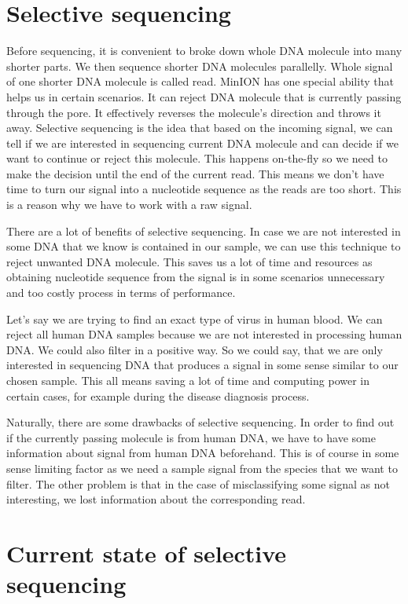 \section{Selective sequencing}

Before sequencing, it is convenient to broke down whole DNA molecule into many
shorter parts. We then sequence shorter DNA molecules parallelly. Whole signal
of one shorter DNA molecule is called read. MinION has one special ability that
helps us in certain scenarios. It can reject DNA molecule that is currently passing
through the pore. It effectively reverses the molecule’s direction and throws it away.
Selective sequencing is the idea that based on the incoming signal, we can tell
if we are interested in sequencing current DNA molecule and can decide if we want
to continue or reject this molecule. This happens on-the-fly so we need to make
the decision until the end of the current read. This means we don't have time to
turn our signal into a nucleotide sequence as the reads are too short. This is
a reason why we have to work with a raw signal.

There are a lot of benefits of selective sequencing. In case we are not interested
in some DNA that we know is contained in our sample, we can use this technique to
reject unwanted DNA molecule. This saves us a lot of time and resources as obtaining
nucleotide sequence from the signal is in some scenarios unnecessary and too
costly process in terms of performance.

Let's say we are trying to find an exact type of virus in human blood. We can
reject all human DNA samples because we are not interested in processing human
DNA. We could also filter in a positive way. So we could say, that we are only
interested in sequencing DNA that produces a signal in some sense similar to our
chosen sample. This all means saving a lot of time and computing power in certain
cases, for example during the disease diagnosis process.

Naturally, there are some drawbacks of selective sequencing. In order to find out
if the currently passing molecule is from human DNA, we have to have some information
about signal from human DNA beforehand.
This is of course in some sense limiting factor as we need a sample signal from
the species that we want to filter. The other problem is that in the case of misclassifying
some signal as not interesting, we lost information about the corresponding
read.

\section{Current state of selective sequencing}
